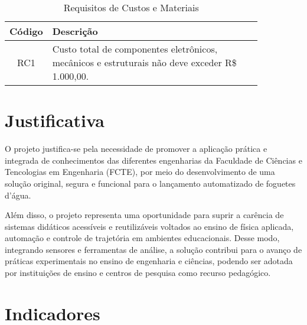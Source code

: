 \begin{samepage}
\begin{table}[H]
\centering
\scriptsize
\setlength{\tabcolsep}{4pt}
\caption{Requisitos de Custos e Materiais}
\begin{tabular}{|c|p{0.85\linewidth}|}
\hline
\textbf{Código} & \textbf{Descrição} \\
\hline
RC1 & Custo total de componentes eletrônicos, mecânicos e estruturais não deve exceder R\$ 1.000,00. \\
\hline
\end{tabular}
\label{tab:requisitos-custos}
\end{table}
\end{samepage}

\section{Justificativa}

O projeto justifica-se pela necessidade de promover a aplicação prática e integrada de conhecimentos das diferentes engenharias da Faculdade de Ciências e Tencologias em Engenharia (FCTE), por meio do desenvolvimento de uma solução original, segura e funcional para o lançamento automatizado de foguetes d’água. 

Além disso, o projeto representa uma oportunidade para suprir a carência de sistemas didáticos acessíveis e reutilizáveis voltados ao ensino de física aplicada, automação e controle de trajetória em ambientes educacionais. Desse modo, integrando sensores e ferramentas de análise, a solução contribui para o avanço de práticas experimentais no ensino de engenharia e ciências, podendo ser adotada por instituições de ensino e centros de pesquisa como recurso pedagógico. 



\section{Indicadores}


